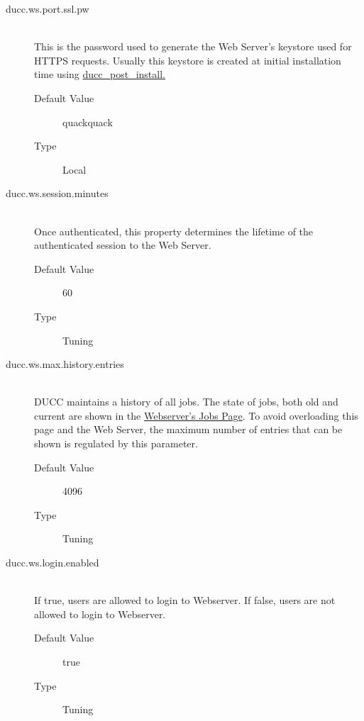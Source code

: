 \begin{description}
        \item[ducc.ws.port.ssl.pw] \hfill \\
          This is the password used to generate the Web Server's keystore used for HTTPS requests.  Usually
          this keystore is created at initial installation time using \hyperref[subsec:install.single-user]{ducc\_post\_install.}
          \begin{description}
            \item[Default Value] quackquack 
            \item[Type] Local
          \end{description}
                    
        \item[ducc.ws.session.minutes] \hfill \\
          Once authenticated, this property determines the lifetime of the authenticated session to the 
          Web Server. 
          \begin{description}
            \item[Default Value] 60 
            \item[Type] Tuning
          \end{description}

        \item[ducc.ws.max.history.entries] \hfill \\
          DUCC maintains a history of all jobs.  The state of jobs, both old and current are shown
          in the \hyperref[]{Webserver's Jobs Page}.  To avoid overloading this page and the Web Server, the maximum
          number of entries that can be shown is regulated by this parameter.
          \begin{description}
            \item[Default Value] 4096
            \item[Type] Tuning
          \end{description}

        \item[ducc.ws.login.enabled] \hfill \\
          If true, users are allowed to login to Webserver.  If false, users are
          not allowed to login to Webserver.
          \begin{description}
            \item[Default Value] true
            \item[Type] Tuning
          \end{description}


\end{description}
